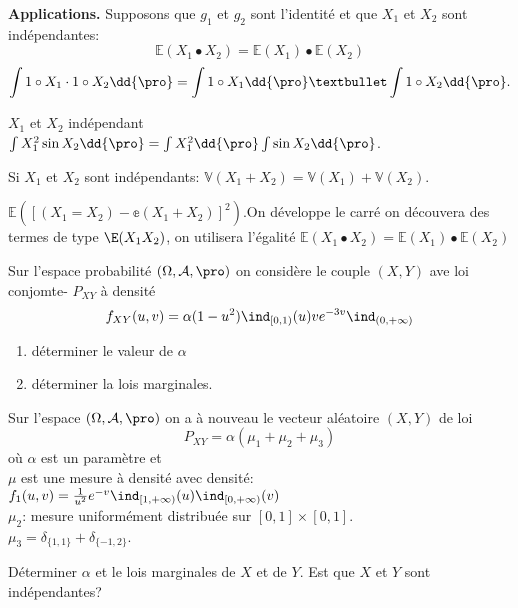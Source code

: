 \textbf{Applications.} Supposons que $g_1$ et $g_2$ sont l'identité et que $X_1$ et $X_2$ sont indépendantes:
	$$\mathbb{E}(X_1• X_2)=\mathbb{E}(X_1)•\mathbb{E}(X_2)$$
	$$\int 1\circ X_1 \cdot 1\circ X_2\dd{\pro}= \int 1\circ X_1 \dd{\pro}•\int 1\circ X_2\dd{\pro}.$$
	
\begin{examplebox}
	$X_1$ et $X_2$ indépendant\\$\int X_1^2 \sin X_2\dd{\pro}=\int X_1^2 \dd{\pro} \int \sin X_2\dd{\pro}$.
\end{examplebox}

\begin{remark}
	Si $X_1$ et $X_2$ sont indépendants: $\mathbb{V}(X_1+X_2)=\mathbb{V}(X_1)+\mathbb{V}(X_2)$.
	
	$\mathbb{E}([(X_1=X_2)-\mathbb{e}(X_1+X_2)]^2)$.On développe le carré on découvera des termes de type $\E(X_1X_2)$, on utilisera l'égalité $\mathbb{E}(X_1• X_2)=\mathbb{E}(X_1)•\mathbb{E}(X_2)$ 
\end{remark}

\begin{examplebox}
	Sur l'espace probabilité $(\Omega, \mathcal{A}, \pro)$ on considère le couple $(X, Y)$ ave loi conjomte- $P_{XY}$ à densité
	$$f_{XY}(u,v)=\alpha(1-u^2)\ind_{[0,1)}(u)v e^{-3v}\ind_{(0, +\infty)}$$
	\begin{enumerate}
		\item déterminer le valeur de $\alpha$
		\item déterminer la lois marginales.
	\end{enumerate}
\end{examplebox}

\begin{examplebox}
	Sur l'espace $(\Omega,\mathcal{A},\pro)$ on a à nouveau le vecteur aléatoire $(X, Y)$ de loi 
	$$P_{XY}=\alpha(\mu_1+\mu_2+\mu_3)$$
	où $\alpha$ est un paramètre et\\
	$\mu$ est une mesure à densité avec densité:
		$f_1(u, v)=\frac{1}{u^2}e^{-v}\ind_{[1,+\infty)}(u)\ind_{[0, +\infty)}(v)$\\
	$\mu_2$: mesure uniformément distribuée sur $[0,1]\times[0,1]$.\\
	$\mu_3=\delta_{\{1,1\}}+\delta_{\{-1,2\}}$. 
	
	Déterminer $\alpha$ et le lois marginales de $X$ et de $Y$. Est que $X$ et $Y$ sont indépendantes?
\end{examplebox}

